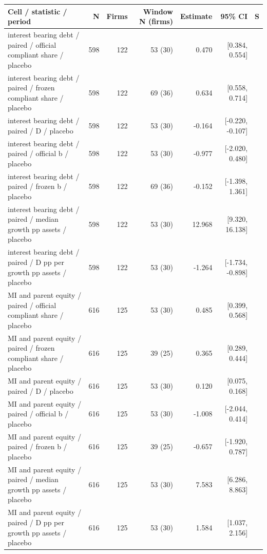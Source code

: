 \begin{threeparttable}
\begin{tabular}{p{5.7cm}rrrrrl}
\toprule
Cell / statistic / period & N & Firms & Window N (firms) & Estimate & 95\% CI & S \\
\midrule
interest bearing debt / paired / official compliant share / placebo & 598 & 122 & 53 (30) & 0.470 & [0.384, 0.554] &  \\
interest bearing debt / paired / frozen compliant share / placebo & 598 & 122 & 69 (36) & 0.634 & [0.558, 0.714] &  \\
interest bearing debt / paired / D / placebo & 598 & 122 & 53 (30) & -0.164 & [-0.220, -0.107] &  \\
interest bearing debt / paired / official b / placebo & 598 & 122 & 53 (30) & -0.977 & [-2.020, 0.480] &  \\
interest bearing debt / paired / frozen b / placebo & 598 & 122 & 69 (36) & -0.152 & [-1.398, 1.361] &  \\
interest bearing debt / paired / median growth pp assets / placebo & 598 & 122 & 53 (30) & 12.968 & [9.320, 16.138] &  \\
interest bearing debt / paired / D pp per growth pp assets / placebo & 598 & 122 & 53 (30) & -1.264 & [-1.734, -0.898] &  \\
MI and parent equity / paired / official compliant share / placebo & 616 & 125 & 53 (30) & 0.485 & [0.399, 0.568] &  \\
MI and parent equity / paired / frozen compliant share / placebo & 616 & 125 & 39 (25) & 0.365 & [0.289, 0.444] &  \\
MI and parent equity / paired / D / placebo & 616 & 125 & 53 (30) & 0.120 & [0.075, 0.168] &  \\
MI and parent equity / paired / official b / placebo & 616 & 125 & 53 (30) & -1.008 & [-2.044, 0.414] &  \\
MI and parent equity / paired / frozen b / placebo & 616 & 125 & 39 (25) & -0.657 & [-1.920, 0.787] &  \\
MI and parent equity / paired / median growth pp assets / placebo & 616 & 125 & 53 (30) & 7.583 & [6.286, 8.863] &  \\
MI and parent equity / paired / D pp per growth pp assets / placebo & 616 & 125 & 53 (30) & 1.584 & [1.037, 2.156] &  \\
\bottomrule
\end{tabular}
\begin{tablenotes}[flushleft]\footnotesize

\end{tablenotes}
\end{threeparttable}
